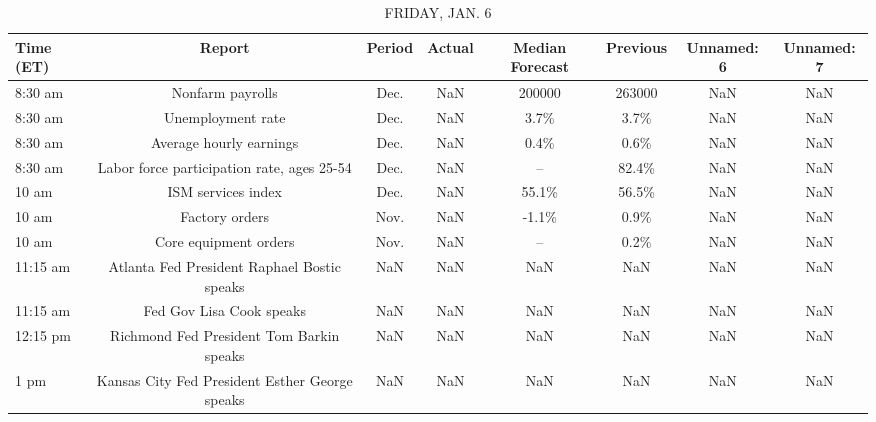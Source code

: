 \documentclass{article}%
\begin{document}
\begin{table}[htbp]%
\caption{FRIDAY, JAN. 6}%
\centering%
\begin{adjustbox}{width=1\textwidth}%
\begin{tabular}{lccccccc}
\toprule
Time (ET) &                                         Report & Period & Actual & Median Forecast & Previous & Unnamed: 6 & Unnamed: 7 \\
\midrule
  8:30 am &                               Nonfarm payrolls &   Dec. &    NaN &          200000 &   263000 &        NaN &        NaN \\
  8:30 am &                              Unemployment rate &   Dec. &    NaN &            3.7\% &     3.7\% &        NaN &        NaN \\
  8:30 am &                        Average hourly earnings &   Dec. &    NaN &            0.4\% &     0.6\% &        NaN &        NaN \\
  8:30 am &     Labor force participation rate, ages 25-54 &   Dec. &    NaN &              -- &    82.4\% &        NaN &        NaN \\
    10 am &                             ISM services index &   Dec. &    NaN &           55.1\% &    56.5\% &        NaN &        NaN \\
    10 am &                                 Factory orders &   Nov. &    NaN &           -1.1\% &     0.9\% &        NaN &        NaN \\
    10 am &                          Core equipment orders &   Nov. &    NaN &              -- &     0.2\% &        NaN &        NaN \\
 11:15 am &    Atlanta Fed President Raphael Bostic speaks &    NaN &    NaN &             NaN &      NaN &        NaN &        NaN \\
 11:15 am &                       Fed Gov Lisa Cook speaks &    NaN &    NaN &             NaN &      NaN &        NaN &        NaN \\
 12:15 pm &       Richmond Fed President Tom Barkin speaks &    NaN &    NaN &             NaN &      NaN &        NaN &        NaN \\
     1 pm & Kansas City Fed President Esther George speaks &    NaN &    NaN &             NaN &      NaN &        NaN &        NaN \\
\bottomrule
\end{tabular}
%
\end{adjustbox}%
\end{table}

%
\end{document}
